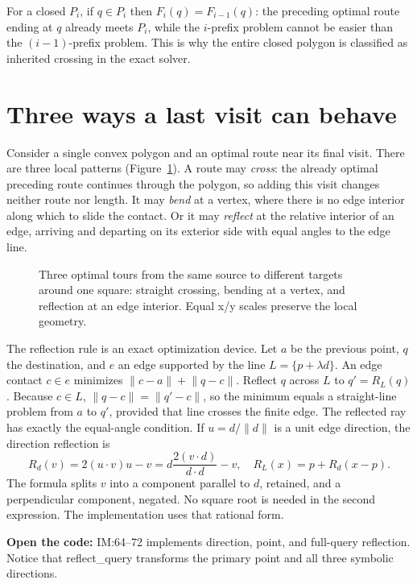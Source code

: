 \documentclass[12pt,a4paper]{article}
\newcommand{\norm}[1]{\lVert#1\rVert}
\newcommand{\code}[1]{{\ttfamily\color{codekw}#1}}
\begin{document}
For a closed \(P_i\), if \(q\in P_i\) then \(F_i(q)=F_{i-1}(q)\): the preceding optimal route ending at \(q\) already meets \(P_i\), while the \(i\)-prefix problem cannot be easier than the \((i-1)\)-prefix problem. This is why the entire closed polygon is classified as inherited crossing in the exact solver.

\section{Three ways a last visit can behave}
Consider a single convex polygon and an optimal route near its final visit. There are three local patterns (Figure~\ref{fig:contacts}). A route may \emph{cross}: the already optimal preceding route continues through the polygon, so adding this visit changes neither route nor length. It may \emph{bend} at a vertex, where there is no edge interior along which to slide the contact. Or it may \emph{reflect} at the relative interior of an edge, arriving and departing on its exterior side with equal angles to the edge line.

\begin{figure}[h]\centering\figcontacts\caption{Three optimal tours from the same source to different targets around one square: straight crossing, bending at a vertex, and reflection at an edge interior. Equal x/y scales preserve the local geometry.}\label{fig:contacts}\end{figure}

The reflection rule is an exact optimization device. Let \(a\) be the previous point, \(q\) the destination, and \(e\) an edge supported by the line \(L=\{p+\lambda d\}\). An edge contact \(c\in e\) minimizes \(\norm{c-a}+\norm{q-c}\). Reflect \(q\) across \(L\) to \(q'=R_L(q)\). Because \(c\in L\), \(\norm{q-c}=\norm{q'-c}\), so the minimum equals a straight-line problem from \(a\) to \(q'\), provided that line crosses the finite edge. The reflected ray has exactly the equal-angle condition. If \(u=d/\norm d\) is a unit edge direction, the direction reflection is
\begin{equation}\label{eq:reflect}
R_d(v)=2(u\cdot v)u-v
=d\frac{2(v\cdot d)}{d\cdot d}-v,
\quad R_L(x)=p+R_d(x-p).
\end{equation}
The formula splits \(v\) into a component parallel to \(d\), retained, and a perpendicular component, negated. No square root is needed in the second expression. The implementation uses that rational form.
\begin{sourcebox}
\textbf{Open the code:} \code{IM:64--72} implements direction, point, and full-query reflection. Notice that \code{reflect\_query} transforms the primary point and all three symbolic directions.
\end{sourcebox}
\end{document}
